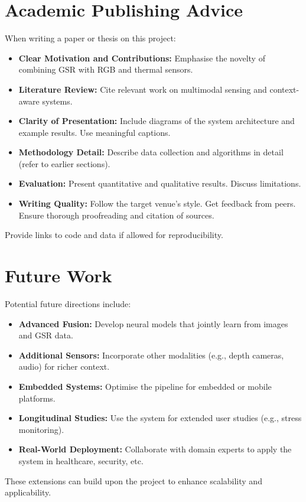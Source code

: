 \documentclass{article}
\begin{document}
    \section{Academic Publishing Advice}

    When writing a paper or thesis on this project:
    \begin{itemize}
        \item \textbf{Clear Motivation and Contributions:} Emphasise the novelty of combining GSR with RGB and thermal sensors.
        \item \textbf{Literature Review:} Cite relevant work on multimodal sensing and context-aware systems.
        \item \textbf{Clarity of Presentation:} Include diagrams of the system architecture and example results. Use meaningful captions.
        \item \textbf{Methodology Detail:} Describe data collection and algorithms in detail~\cite{RefMethodology} (refer to earlier sections).
        \item \textbf{Evaluation:} Present quantitative and qualitative results. Discuss limitations.
        \item \textbf{Writing Quality:} Follow the target venue’s style. Get feedback from peers. Ensure thorough proofreading and citation of sources.
    \end{itemize}
    Provide links to code and data if allowed for reproducibility.


    \section{Future Work}

    Potential future directions include:
    \begin{itemize}
        \item \textbf{Advanced Fusion:} Develop neural models that jointly learn from images and GSR data.
        \item \textbf{Additional Sensors:} Incorporate other modalities (e.g., depth cameras, audio) for richer context.
        \item \textbf{Embedded Systems:} Optimise the pipeline for embedded or mobile platforms.
        \item \textbf{Longitudinal Studies:} Use the system for extended user studies (e.g., stress monitoring).
        \item \textbf{Real-World Deployment:} Collaborate with domain experts to apply the system in healthcare, security, etc.
    \end{itemize}
    These extensions can build upon the project to enhance scalability and applicability.


\end{document}
